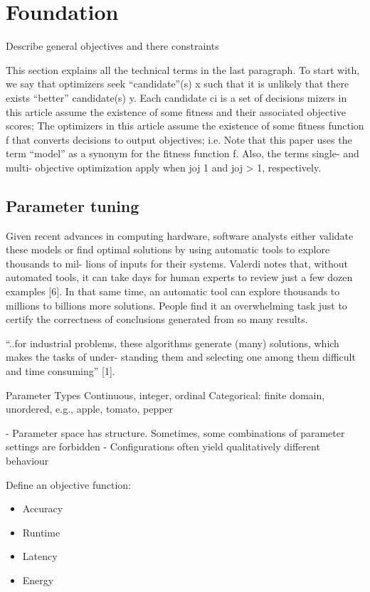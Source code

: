 \chapter{Foundation}
    Describe general objectives and there constraints


    This section explains all the technical terms in the last paragraph. To start with, we say that optimizers seek “candidate”(s) x such that it is 
    unlikely that there exists “better” candidate(s) y. Each candidate ci is a set of decisions mizers 
    in this article assume the existence of some fitness and their associated objective scores; 
    The optimizers in this article assume the existence of some fitness function f that converts decisions to output objectives; i.e.
    Note that this paper uses the term “model” as a synonym for the fitness function f. 
    Also, the terms single- and multi- objective optimization apply when joj 1 and joj > 1, respectively.

    \section{Parameter tuning}

        Given recent advances in computing hardware, software analysts either validate these models or find 
        optimal solutions by using automatic tools to explore thousands to mil- lions of inputs for their systems. 
        Valerdi notes that, without automated tools, it can take days for human experts to review just a few dozen examples [6]. 
        In that same time, an automatic tool can explore thousands to millions to billions more solutions. 
        People find it an overwhelming task just to certify the correctness of conclusions generated from so many results.

        “..for industrial problems, these algorithms generate (many) solutions, which makes the tasks of under- standing them and selecting one among them difficult and time consuming” [1].



        Parameter Types
        Continuous, integer, ordinal
        Categorical: finite domain, unordered, e.g., {apple, tomato, pepper}

        - Parameter space has structure. Sometimes, some combinations of parameter settings are forbidden
        - Configurations often yield qualitatively different behaviour

        Define an objective function: 
        \begin{itemize}
            \item Accuracy
            \item Runtime
            \item Latency
            \item Energy
        \end{itemize}

